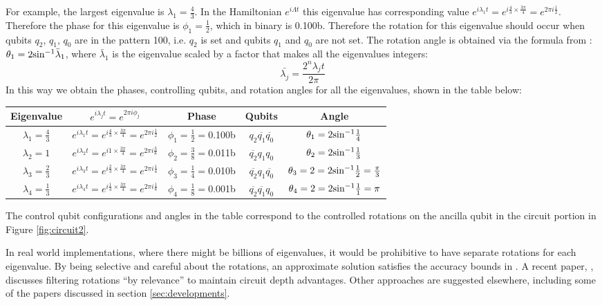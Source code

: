 \documentclass[12pt]{extarticle}
\begin{document}
For example, the largest eigenvalue is $\lambda_1=\frac{4}{3}$.
In the Hamiltonian $e^{i\Lambda t}$ this eigenvalue has corresponding value $e^{i\lambda_1t}=e^{i\frac{4}{3}\times\frac{3\pi}{4}}=e^{2\pi i \frac{1}{2}}$.
Therefore the phase for this eigenvalue is $\phi_1=\frac{1}{2}$, which in binary is 0.100b.
Therefore the rotation for this eigenvalue should occur when qubits $q_2$, $q_1$, $q_0$ are in the pattern 100,
i.e. $q_2$ is set and qubits $q_1$ and $q_0$ are not set.
The rotation angle is obtained via the formula from \cite{zaman2023step}: $\theta_1=2{{\sin}^{-1}}\bar{\lambda}_1$,
where $\bar{\lambda}_1$ is the eigenvalue scaled by a factor that makes all the eigenvalues integers:
\[
\bar{\lambda_j}=\frac{2^n\lambda_jt}{2\pi}
\]
In this way we obtain the phases, controlling qubits, and rotation angles for all the eigenvalues, shown in the table below:
\begin{center}
\begin{tabular}{|c|c|c|c|c|}
\hline
Eigenvalue & $e^{i\lambda_j t}=e^{2\pi i\phi_j}$ & Phase & Qubits & Angle \\
\hline
$\lambda_1=\frac{4}{3}$ & $e^{i\lambda_1t}=e^{i \frac{4}{3} \times \frac{3\pi}{4}}=e^{2\pi i \frac{1}{2}}$ & $\phi_1=\frac{1}{2}=$0.100b & $q_2\overline{q_1}\overline{q_0}$ & $\theta_1=2{{\sin}^{-1}}\frac{1}{4}$ \\
$\lambda_2=1$           & $e^{i\lambda_2t}=e^{i 1 \times \frac{3\pi}{4}}=e^{2\pi i \frac{3}{8}}$   & $\phi_2=\frac{3}{8}=$0.011b & $\overline{q_2}q_1q_0$ & $\theta_2=2{{\sin}^{-1}}\frac{1}{3}$ \\
$\lambda_3=\frac{2}{3}$ & $e^{i\lambda_3t}=e^{i \frac{2}{3} \times \frac{3\pi}{4}}=e^{2\pi i \frac{1}{4}}$ & $\phi_3=\frac{1}{4}=$0.010b & $\overline{q_2}q_1\overline{q_0}$ & $\theta_3=2=2{{\sin}^{-1}}\frac{1}{2}=\frac{\pi}{3}$ \\
$\lambda_4=\frac{1}{3}$ & $e^{i\lambda_4t}=e^{i \frac{1}{3} \times \frac{3\pi}{4}}=e^{2\pi i \frac{1}{8}}$ & $\phi_4=\frac{1}{8}=$0.001b & $\overline{q_2}\overline{q_1}q_0$ & $\theta_4=2=2{{\sin}^{-1}}\frac{1}{1}=\pi$ \\
\hline
\end{tabular}
\end{center}
The control qubit configurations and angles in the table correspond to the controlled rotations on the ancilla qubit in the circuit portion in Figure \ref{fig:circuit2}.

In real world implementations, where there might be billions of eigenvalues, it would be prohibitive to have separate rotations for each eigenvalue.
By being selective and careful about the rotations, an approximate solution satisfies the accuracy bounds in \cite{hhl2009}.
A recent paper, \cite{morgan2024enhanced}, discusses filtering rotations ``by relevance'' to maintain circuit depth advantages.
Other approaches are suggested elsewhere, including some of the papers discussed in section \ref{sec:developments}.
\end{document}
